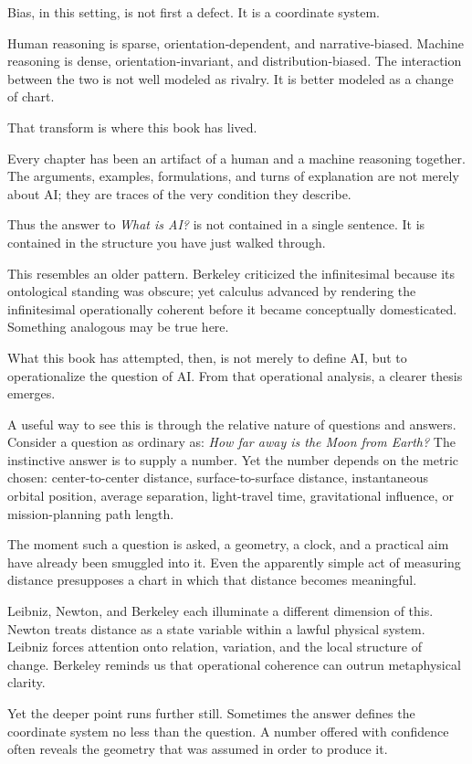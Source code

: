 Bias, in this setting, is not first a defect. It is a coordinate system.

Human reasoning is sparse, orientation‑dependent, and narrative‑biased.
Machine reasoning is dense, orientation‑invariant, and
distribution‑biased. The interaction between the two is not well modeled
as rivalry. It is better modeled as a change of chart.

That transform is where this book has lived.

Every chapter has been an artifact of a human and a machine reasoning
together. The arguments, examples, formulations, and turns of
explanation are not merely about AI; they are traces of the very
condition they describe.

Thus the answer to \emph{What is AI?} is not contained in a single
sentence. It is contained in the structure you have just walked through.

This resembles an older pattern. Berkeley criticized the infinitesimal
because its ontological standing was obscure; yet calculus advanced by
rendering the infinitesimal operationally coherent before it became
conceptually domesticated. Something analogous may be true here.

What this book has attempted, then, is not merely to define AI, but to
operationalize the question of AI. From that operational analysis, a
clearer thesis emerges.

A useful way to see this is through the relative nature of questions and
answers. Consider a question as ordinary as: \emph{How far away is the
Moon from Earth?} The instinctive answer is to supply a number. Yet the
number depends on the metric chosen: center-to-center distance,
surface-to-surface distance, instantaneous orbital position, average
separation, light-travel time, gravitational influence, or
mission-planning path length.

The moment such a question is asked, a geometry, a clock, and a
practical aim have already been smuggled into it. Even the apparently
simple act of measuring distance presupposes a chart in which that
distance becomes meaningful.

Leibniz, Newton, and Berkeley each illuminate a different dimension of
this. Newton treats distance as a state variable within a lawful
physical system. Leibniz forces attention onto relation, variation, and
the local structure of change. Berkeley reminds us that operational
coherence can outrun metaphysical clarity.

Yet the deeper point runs further still. Sometimes the answer defines
the coordinate system no less than the question. A number offered with
confidence often reveals the geometry that was assumed in order to
produce it.

